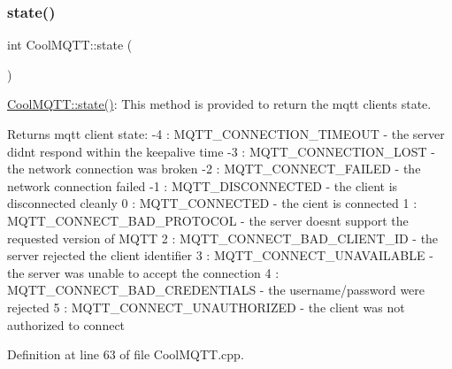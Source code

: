 \subsubsection{\texorpdfstring{state()}{state()}}
{\footnotesize\ttfamily int Cool\+M\+Q\+T\+T\+::state (\begin{DoxyParamCaption}{ }\end{DoxyParamCaption})}

\hyperlink{class_cool_m_q_t_t_a5d003307eff78efbd585e42b43b72b6d}{Cool\+M\+Q\+T\+T\+::state()}\+: This method is provided to return the mqtt client\textquotesingle{}s state. \begin{DoxyReturn}{Returns}
mqtt client state\+: -\/4 \+: M\+Q\+T\+T\+\_\+\+C\+O\+N\+N\+E\+C\+T\+I\+O\+N\+\_\+\+T\+I\+M\+E\+O\+UT -\/ the server didn\textquotesingle{}t respond within the keepalive time -\/3 \+: M\+Q\+T\+T\+\_\+\+C\+O\+N\+N\+E\+C\+T\+I\+O\+N\+\_\+\+L\+O\+ST -\/ the network connection was broken -\/2 \+: M\+Q\+T\+T\+\_\+\+C\+O\+N\+N\+E\+C\+T\+\_\+\+F\+A\+I\+L\+ED -\/ the network connection failed -\/1 \+: M\+Q\+T\+T\+\_\+\+D\+I\+S\+C\+O\+N\+N\+E\+C\+T\+ED -\/ the client is disconnected cleanly 0 \+: M\+Q\+T\+T\+\_\+\+C\+O\+N\+N\+E\+C\+T\+ED -\/ the cient is connected 1 \+: M\+Q\+T\+T\+\_\+\+C\+O\+N\+N\+E\+C\+T\+\_\+\+B\+A\+D\+\_\+\+P\+R\+O\+T\+O\+C\+OL -\/ the server doesn\textquotesingle{}t support the requested version of M\+Q\+TT 2 \+: M\+Q\+T\+T\+\_\+\+C\+O\+N\+N\+E\+C\+T\+\_\+\+B\+A\+D\+\_\+\+C\+L\+I\+E\+N\+T\+\_\+\+ID -\/ the server rejected the client identifier 3 \+: M\+Q\+T\+T\+\_\+\+C\+O\+N\+N\+E\+C\+T\+\_\+\+U\+N\+A\+V\+A\+I\+L\+A\+B\+LE -\/ the server was unable to accept the connection 4 \+: M\+Q\+T\+T\+\_\+\+C\+O\+N\+N\+E\+C\+T\+\_\+\+B\+A\+D\+\_\+\+C\+R\+E\+D\+E\+N\+T\+I\+A\+LS -\/ the username/password were rejected 5 \+: M\+Q\+T\+T\+\_\+\+C\+O\+N\+N\+E\+C\+T\+\_\+\+U\+N\+A\+U\+T\+H\+O\+R\+I\+Z\+ED -\/ the client was not authorized to connect 
\end{DoxyReturn}


Definition at line 63 of file Cool\+M\+Q\+T\+T.\+cpp.


